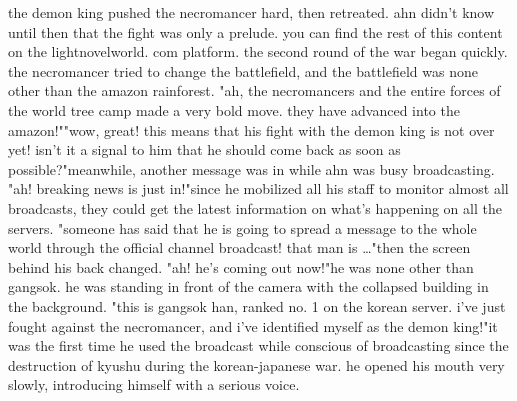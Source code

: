 the demon king pushed the necromancer hard, then retreated.
ahn didn't know until then that the fight was only a prelude.
you can find the rest of this content on the lightnov‌elworld.
com platform.
the second round of the war began quickly.
 the necromancer tried to change the battlefield, and the battlefield was none other than the amazon rainforest.
"ah, the necromancers and the entire forces of the world tree camp made a very bold move.
 they have advanced into the amazon!""wow, great! this means that his fight with the demon king is not over yet! isn't it a signal to him that he should come back as soon as possible?"meanwhile, another message was in while ahn was busy broadcasting.
 "ah! breaking news is just in!"since he mobilized all his staff to monitor almost all broadcasts, they could get the latest information on what's happening on all the servers.
"someone has said that he is going to spread a message to the whole world through the official channel broadcast! that man is …"then the screen behind his back changed.
 "ah! he's coming out now!"he was none other than gangsok.
 he was standing in front of the camera with the collapsed building in the background.
"this is gangsok han, ranked no.
 1 on the korean server.
 i've just fought against the necromancer, and i've identified myself as the demon king!"it was the first time he used the broadcast while conscious of broadcasting since the destruction of kyushu during the korean-japanese war.
he opened his mouth very slowly, introducing himself with a serious voice.

